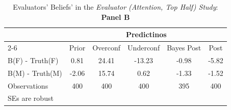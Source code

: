 \begin{table}[htbp]\centering
\caption{Evaluators' Beliefs' in the \textit{Evaluator (Attention, Top Half) Study}: \textbf{Panel B}}
\begin{tabular}{l*{5}{c}}
\hline\hline
                &\multicolumn{5}{c}{Predictinos}                  \\\cmidrule(lr){2-6}
                &\multicolumn{1}{c}{Prior}&\multicolumn{1}{c}{Overconf}&\multicolumn{1}{c}{Underconf}&\multicolumn{1}{c}{Bayes Post}&\multicolumn{1}{c}{Post}\\
\hline
B(F) - Truth(F) &     0.81&    24.41&   -13.23&    -0.98&    -5.82\\
B(M) - Truth(M) &    -2.06&    15.74&     0.62&    -1.33&    -1.52\\
\hline
Observations    &      400&      400&      400&      395&      400\\
\hline\hline
\multicolumn{6}{l}{\footnotesize SEs are robust}\\
\end{tabular}
\end{table}
